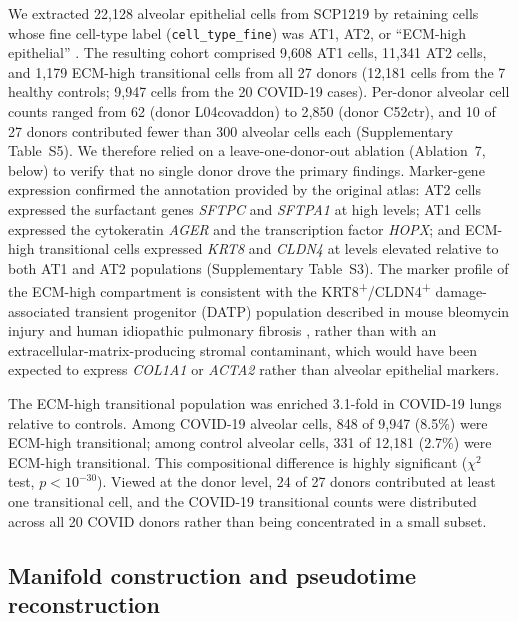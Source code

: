 \documentclass[11pt]{article}
\begin{document}
We extracted 22{,}128 alveolar epithelial cells from SCP1219 by retaining cells whose fine cell-type label (\texttt{cell\_type\_fine}) was AT1, AT2, or ``ECM-high epithelial'' \citep{Melms2021}. The resulting cohort comprised 9{,}608 AT1 cells, 11{,}341 AT2 cells, and 1{,}179 ECM-high transitional cells from all 27 donors (12{,}181 cells from the 7 healthy controls; 9{,}947 cells from the 20 COVID-19 cases). Per-donor alveolar cell counts ranged from 62 (donor L04covaddon) to 2{,}850 (donor C52ctr), and 10 of 27 donors contributed fewer than 300 alveolar cells each (Supplementary Table~S5). We therefore relied on a leave-one-donor-out ablation (Ablation~7, below) to verify that no single donor drove the primary findings. Marker-gene expression confirmed the annotation provided by the original atlas: AT2 cells expressed the surfactant genes \textit{SFTPC} and \textit{SFTPA1} at high levels; AT1 cells expressed the cytokeratin \textit{AGER} and the transcription factor \textit{HOPX}; and ECM-high transitional cells expressed \textit{KRT8} and \textit{CLDN4} at levels elevated relative to both AT1 and AT2 populations (Supplementary Table~S3). The marker profile of the ECM-high compartment is consistent with the KRT8\textsuperscript{+}/CLDN4\textsuperscript{+} damage-associated transient progenitor (DATP) population described in mouse bleomycin injury and human idiopathic pulmonary fibrosis \citep{Kobayashi2020, Strunz2020, Adams2020, Habermann2020}, rather than with an extracellular-matrix-producing stromal contaminant, which would have been expected to express \textit{COL1A1} or \textit{ACTA2} rather than alveolar epithelial markers.

The ECM-high transitional population was enriched 3.1-fold in COVID-19 lungs relative to controls. Among COVID-19 alveolar cells, 848 of 9{,}947 (8.5\%) were ECM-high transitional; among control alveolar cells, 331 of 12{,}181 (2.7\%) were ECM-high transitional. This compositional difference is highly significant ($\chi^2$ test, $p < 10^{-30}$). Viewed at the donor level, 24 of 27 donors contributed at least one transitional cell, and the COVID-19 transitional counts were distributed across all 20 COVID donors rather than being concentrated in a small subset.

\subsection{Manifold construction and pseudotime reconstruction}
\end{document}
